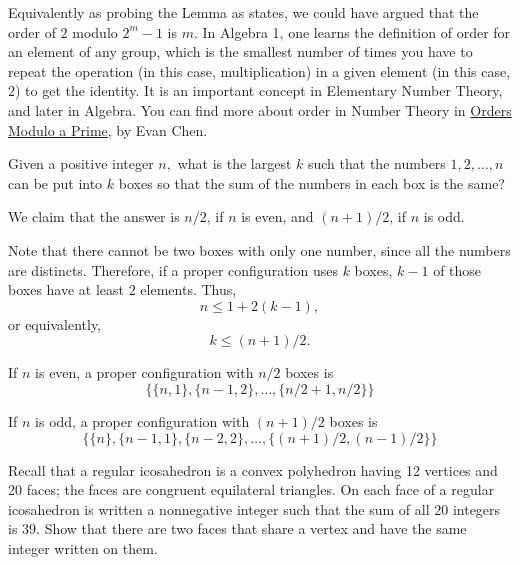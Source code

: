 \begin{com}
	Equivalently as probing the Lemma as states, we could have argued that the order of \(2\) modulo \(2^m - 1\) is \(m\). In Algebra 1, one learns the definition of order for an element of any group,  which is the smallest number of times you have to repeat the operation (in this case, multiplication) in a given element (in this case, \(2\)) to get the identity. It is an important concept in Elementary Number Theory, and later in Algebra. You can find more about order in Number Theory in \href{https://web.evanchen.cc/handouts/ORPR/ORPR.pdf}{Orders Modulo a Prime}, by Evan Chen.
\end{com}

\newpage
\begin{prob}[Putnam 2010, A1]
Given a positive integer $n,$ what is the largest $k$ such that the numbers $1,2,\dots,n$ can be put into $k$ boxes so that the sum of the numbers in each box is the same?
\end{prob}

\begin{sol}
	We claim that the answer is \(n/2\), if \(n\) is even, and \((n+1)/2\), if \(n\) is odd.

	Note that there cannot be two boxes with only one number, since all the numbers are distincts. Therefore, if a proper configuration uses \(k\) boxes, \(k - 1\) of those boxes have at least \(2\) elements. Thus, \[
		n \leq 1 + 2(k-1),
	\]
	or equivalently, \[
		k \leq (n + 1)/2.
	\]

	If \(n\) is even, a proper configuration with \(n/2\) boxes is \[
		\{\{n, 1\}, \{n - 1, 2\}, \dots, \{n/2 + 1, n/2\}\}
	\]

	If \(n\) is odd, a proper configuration with \((n+1)/2\) boxes is \[
		\{\{n\}, \{n-1, 1\}, \{n - 2, 2\}, \dots, \{(n+1)/2, (n-1)/2\}\}
	\]
	
\end{sol}

\newpage
\begin{prob}[Putnam 2013, A1]
Recall that a regular icosahedron is a convex polyhedron having 12 vertices and 20 faces; the faces are congruent equilateral triangles. On each face of a regular icosahedron is written a nonnegative integer such that the sum of all $20$ integers is $39.$ Show that there are two faces that share a vertex and have the same integer written on them.
\end{prob}

